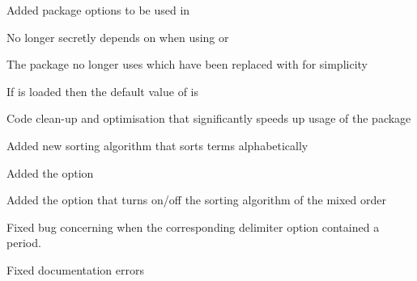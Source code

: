\begin{changelog}
\begin{change}[version = 1.1, date = 2021-06-03, beta = false]
			\item Added package options to be used in 
			\item No longer secretly depends on  when using \xetex{} or \luatex
			\item The package no longer uses  which have been replaced with  for simplicity
			\item If  is loaded then the default value of  is 
		\end{change}
		\begin{change}[version = 1.2, date = 2022-07-09, beta = false]
			\item Code clean-up and optimisation that significantly speeds up usage of the package
			\item Added new sorting algorithm  that sorts terms alphabetically
			\item Added the option  
			\item Added the option  that turns on/off the sorting algorithm of the mixed order
			\item Fixed bug concerning  when the corresponding delimiter option contained a period.
			\item Fixed documentation errors
		\end{change}
	\end{changelog}
		
	